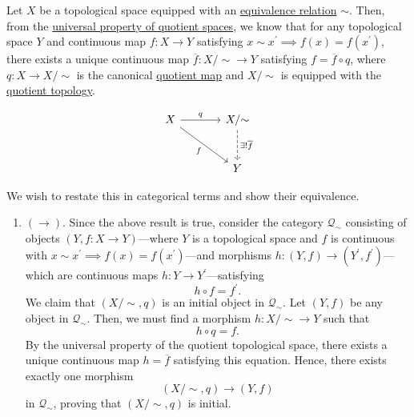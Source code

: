 	\begin{example}
	  \label{ex:quotient-topological-spaces-as-initial}
		Let $X$ be a topological space equipped with an \hyperref[st-def:equivalence_relation]{equivalence relation} $\sim$. Then, from the \hyperref[pst-thm:universal_quotient]{universal property of quotient spaces}, we know that for any topological space $Y$ and continuous map $f: X \to Y$ satisfying $x \sim x^\prime \implies f(x) = f(x^\prime)$, there exists a unique continuous map $\overline{f}: X/{\sim} \to Y$ satisfying $f = \overline{f} \circ q$, where $q: X \to X/{\sim}$ is the canonical \hyperref[pst-def:quotient-map]{quotient map} and $X/{\sim}$ is equipped with the \hyperref[pst-def:quotient-topology]{quotient topology}.

		\begin{equation}
			\begin{tikzcd}[column sep=large, row sep=large]
				X \arrow[r, "q"] \arrow[dr, "f"'] &
				X/{\sim} \arrow[d, dashed, "\exists!\overline f"] \\
				& Y
			\end{tikzcd}
		\end{equation}

		We wish to restate this in categorical terms and show their equivalence.
		\begin{enumerate}
			\item $(\rightarrow)$. Since the above result is true, consider the category $\mathcal{Q}_{\sim}$ consisting of objects $(Y, f: X \to Y)$---where $Y$ is a topological space and $f$ is continuous with $x \sim x^\prime \implies f(x) = f(x^\prime)$---and morphisms $h: (Y, f) \to (Y^\prime, f^\prime)$---which are continuous maps $h: Y \to Y^\prime$---satisfying
				\begin{equation}
					h \circ f = f^\prime.
				\end{equation}
				We claim that $(X/{\sim}, q)$ is an initial object in $\mathcal{Q}_{\sim}$. Let $(Y, f)$ be any object in $\mathcal{Q}_{\sim}$. Then, we must find a morphism $h: X/{\sim} \to Y$ such that
				\begin{equation}
					h \circ q = f.
				\end{equation}
				By the universal property of the quotient topological space, there exists a unique continuous map $h = \overline{f}$ satisfying this equation. Hence, there exists exactly one morphism
				\begin{equation}
					(X/{\sim}, q) \to (Y, f)
				\end{equation}
				in $\mathcal{Q}_{\sim}$, proving that $(X/{\sim}, q)$ is initial.


\end{enumerate}
\end{example}
